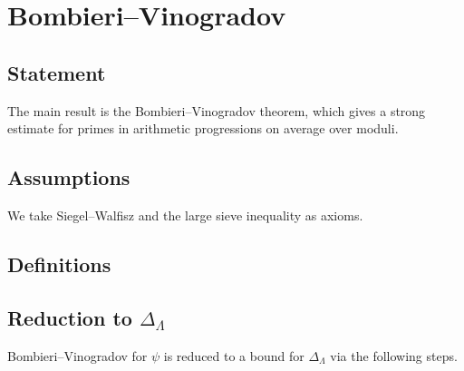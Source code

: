 


\chapter{Bombieri--Vinogradov}

\section{Statement}

The main result is the Bombieri--Vinogradov theorem, which gives a
strong estimate for primes in arithmetic progressions on average over moduli.


\section{Assumptions}

We take Siegel--Walfisz and the large sieve inequality as axioms.


\section{Definitions}


\section{Reduction to \texorpdfstring{$\Delta_\Lambda$}{Delta Lambda}}

Bombieri--Vinogradov for $\psi$ is reduced to a bound for $\Delta_\Lambda$
via the following steps.





